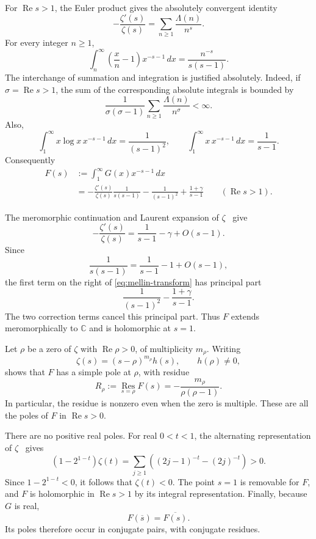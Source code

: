 For $\operatorname{Re}s>1$, the Euler product gives the absolutely convergent identity~\cite[Eq.~(27.4.12)]{dlmf-number-theory}
\[
-\frac{\zeta'(s)}{\zeta(s)}
=
\sum_{n\geq 1}\frac{\Lambda(n)}{n^s}.
\]
For every integer $n\geq 1$,
\[
\int_n^\infty
\left(\frac{x}{n}-1\right)x^{-s-1}\,dx
=
\frac{n^{-s}}{s(s-1)}.
\]
The interchange of summation and integration is justified absolutely. Indeed, if $\sigma=\operatorname{Re}s>1$, the sum of the corresponding absolute integrals is bounded by
\[
\frac{1}{\sigma(\sigma-1)}
\sum_{n\geq 1}\frac{\Lambda(n)}{n^\sigma}<\infty.
\]
Also,
\[
\int_1^\infty x\log x\,x^{-s-1}\,dx
=
\frac{1}{(s-1)^2},
\qquad
\int_1^\infty x\,x^{-s-1}\,dx
=
\frac{1}{s-1}.
\]
Consequently
\begin{equation}\label{eq:mellin-transform}
\begin{aligned}
F(s)
&:=\int_1^\infty G(x)x^{-s-1}\,dx\\
&=
-\frac{\zeta'(s)}{\zeta(s)}\frac{1}{s(s-1)}
-\frac{1}{(s-1)^2}
+\frac{1+\gamma}{s-1}
\qquad(\operatorname{Re}s>1).
\end{aligned}
\end{equation}

The meromorphic continuation and Laurent expansion of $\zeta$~\cite[Eq.~(25.2.4)]{dlmf-zeta} give
\[
-\frac{\zeta'(s)}{\zeta(s)}
=
\frac{1}{s-1}-\gamma+O(s-1).
\]
Since
\[
\frac{1}{s(s-1)}
=
\frac{1}{s-1}-1+O(s-1),
\]
the first term on the right of \eqref{eq:mellin-transform} has principal part
\[
\frac{1}{(s-1)^2}-\frac{1+\gamma}{s-1}.
\]
The two correction terms cancel this principal part. Thus $F$ extends meromorphically to $\mathbb C$ and is holomorphic at $s=1$.

Let $\rho$ be a zero of $\zeta$ with $\operatorname{Re}\rho>0$, of multiplicity $m_\rho$. Writing
\[
\zeta(s)=(s-\rho)^{m_\rho}h(s),
\qquad h(\rho)\ne 0,
\]
shows that $F$ has a simple pole at $\rho$, with residue
\begin{equation}\label{eq:pole-residue}
R_\rho
:=
\operatorname*{Res}_{s=\rho}F(s)
=
-\frac{m_\rho}{\rho(\rho-1)}.
\end{equation}
In particular, the residue is nonzero even when the zero is multiple. These are all the poles of $F$ in $\operatorname{Re}s>0$.

There are no positive real poles. For real $0<t<1$, the alternating representation of $\zeta$~\cite[Eq.~(25.2.3)]{dlmf-zeta} gives
\[
(1-2^{1-t})\zeta(t)
=
\sum_{j\geq 1}
\left((2j-1)^{-t}-(2j)^{-t}\right)>0.
\]
Since $1-2^{1-t}<0$, it follows that $\zeta(t)<0$. The point $s=1$ is removable for $F$, and $F$ is holomorphic in $\operatorname{Re}s>1$ by its integral representation. Finally, because $G$ is real,
\[
F(\overline{s})=\overline{F(s)}.
\]
Its poles therefore occur in conjugate pairs, with conjugate residues.

